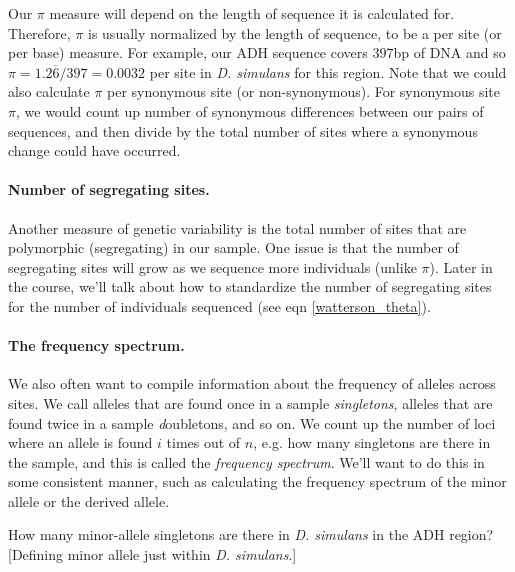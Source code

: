Our $\pi$ measure will depend on the length of sequence it is calculated
for. Therefore, $\pi$ is usually normalized by the length of sequence,
to be a per site (or per base) measure. For example, our ADH sequence covers $397$bp of DNA and so $\pi = 1.2\overline{6}/397=0.0032$ per site in \textit{D. simulans} for this region. Note that we could also calculate $\pi$ per synonymous site (or non-synonymous). For synonymous site $\pi$, we would count up number of synonymous differences between our pairs of sequences, and then divide by the total number of sites where a synonymous change could have occurred.{


\paragraph{Number of segregating sites.} Another measure of genetic variability is the total number of sites
that are polymorphic (segregating) in our sample. One issue is that
the number of segregating sites will grow as we sequence more
individuals (unlike $\pi$). Later in the course, we'll talk about how to standardize the
number of segregating sites for the number of individuals sequenced (see eqn \eqref{watterson_theta}).

\paragraph{The frequency spectrum.}
We also often want to compile information about the frequency of
alleles across sites.  We call alleles that are found once in a sample
\emph{singletons}, alleles that are found twice in a sample {\emph
  doubletons}, and so on. We count up the number of loci where an
allele is found $i$ times out of $n$, e.g. how many singletons are
there in the sample, and this is called the \emph{frequency
  spectrum}. We'll want to do this in some consistent manner, such as calculating the frequency spectrum of the minor allele or the derived allele.

\begin{question}
How many minor-allele singletons are there in \textit{D. simulans} in
the ADH region? [Defining minor allele just within \textit{D. simulans}.]
 \end{question}
}
